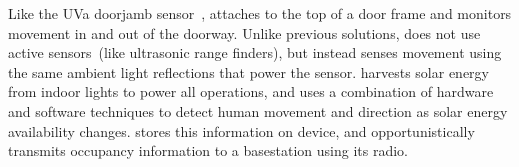 Like the UVa doorjamb sensor~\cite{hnat2012doorjamb}, \sysname attaches to the top of a door frame and monitors movement in and out of the doorway.
Unlike previous solutions, \sysname does not use active sensors~(like ultrasonic range finders), but instead senses movement using the same ambient light reflections that power the sensor.
\sysname harvests solar energy from indoor lights to power all operations, and uses a combination of hardware and software techniques to detect human movement and direction as solar energy availability changes.
\sysname stores this information on device, and opportunistically transmits occupancy information to a basestation using its radio.





